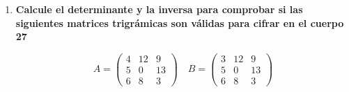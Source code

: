 \documentclass{article}
\begin{document}
\begin{enumerate}
Determinante de C:
 \begin{equation*}
    \begin{vmatrix}
    18 & 15 \\
    7 & 8
    \end{vmatrix} \rightarrow Det=
    18*8 - 15*7 = 39
\end{equation*}
Matriz inversa de C:
\begin{equation*}
    \begin{split}
    C^{-1} &= \frac{(Adj(C)^{T})}{\mid C \mid}\\
    C^{-1} &= \frac{1}{804} \left(
    \begin{array}{cc}
    8 & -15 \\
    -7 & 18
    \end{array}
    \right)\\
    C^{-1} &=  \left(
    \begin{array}{cc}
    8/39 & -5/13 \\
    -7/39 & 6/13
    \end{array}
    \right)
    \end{split}
\end{equation*}

\item \textbf{Calcule el determinante y la inversa para comprobar si las siguientes matrices trigrámicas son válidas para cifrar en el cuerpo 27}



\begin{equation*}
   A = \left(
    \begin{array}{ccc}
    4 & 12 & 9 \\
    5 & 0 & 13 \\
    6 & 8 & 3
    \end{array}
    \right) \quad  B=\left(
    \begin{array}{ccc}
    3 & 12 & 9 \\
    5 & 0 & 13 \\
    6 & 8 & 3
    \end{array}
    \right)
\end{equation*}


\end{enumerate}
\end{document}
